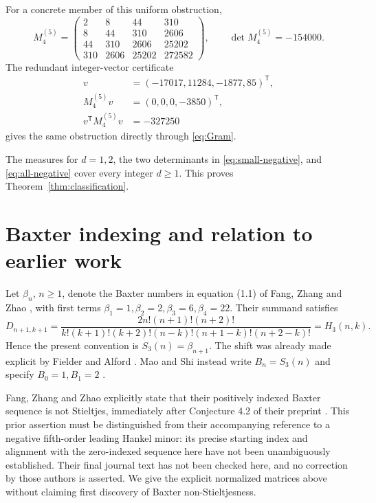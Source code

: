 \documentclass[11pt]{article}
\begin{document}
For a concrete member of this uniform obstruction,
\[
 M_4^{(5)}=\begin{pmatrix}
 2&8&44&310\\
 8&44&310&2606\\
 44&310&2606&25202\\
 310&2606&25202&272582
 \end{pmatrix},\qquad \det M_4^{(5)}=-154000.
\]
The redundant integer-vector certificate
\begin{equation}\label{eq:quadratic}
 \begin{aligned}
 v&=(-17017,11284,-1877,85)^{\mathsf T},\\
 M_4^{(5)}v&=(0,0,0,-3850)^{\mathsf T},\\
 v^{\mathsf T}M_4^{(5)}v&=-327250
 \end{aligned}
\end{equation}
gives the same obstruction directly through \eqref{eq:Gram}.

The measures for $d=1,2$, the two determinants in
\eqref{eq:small-negative}, and \eqref{eq:all-negative} cover every
integer $d\geq1$. This proves Theorem~\ref{thm:classification}.

\section{Baxter indexing and relation to earlier work}

Let $\beta_n$, $n\geq1$, denote the Baxter numbers in equation (1.1)
of Fang, Zhang and Zhao \cite{FZZ}, with first terms
$\beta_1=1,\beta_2=2,\beta_3=6,\beta_4=22$.
Their summand satisfies
\[
 D_{n+1,k+1}
 =\frac{2n!(n+1)!(n+2)!}
 {k!(k+1)!(k+2)!(n-k)!(n+1-k)!(n+2-k)!}
 =H_3(n,k).
\]
Hence the present convention is $S_3(n)=\beta_{n+1}$.
The shift was already made explicit by Fielder and Alford
\cite[p.~162]{FA}. Mao and Shi instead write $B_n=S_3(n)$ and
specify $B_0=1,B_1=2$ \cite[pp.~16--17]{MS}.

Fang, Zhang and Zhao explicitly state that their positively indexed
Baxter sequence is not Stieltjes, immediately after Conjecture 4.2
of their preprint \cite[p.~11]{FZZ}. This prior assertion must be
distinguished from their accompanying reference to a negative
fifth-order leading Hankel minor: its precise starting index and
alignment with the zero-indexed sequence here have not been
unambiguously established. Their final journal text has not been
checked here, and no correction by those authors is asserted.
We give the explicit normalized matrices above without claiming
first discovery of Baxter non-Stieltjesness.
\end{document}
